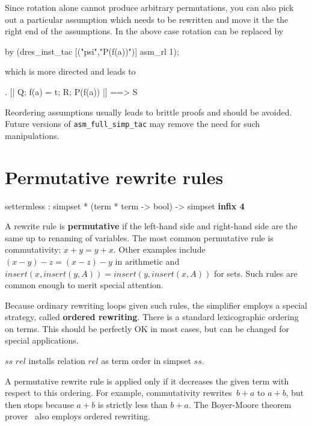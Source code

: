 Since rotation alone cannot produce arbitrary permutations, you can also pick
out a particular assumption which needs to be rewritten and move it the the
right end of the assumptions.  In the above case rotation can be replaced by
\begin{ttbox}
by (dres_inst_tac [("psi","P(f(a))")] asm_rl 1);
\end{ttbox}
which is more directed and leads to
\begin{ttbox}
{. [| Q; f(a) = t; R; P(f(a)) |] ==> S}
\end{ttbox}

\begin{warn}
  Reordering assumptions usually leads to brittle proofs and should be
  avoided.  Future versions of \verb$asm_full_simp_tac$ may remove the
  need for such manipulations.
\end{warn}


\section{Permutative rewrite rules}
\begin{ttbox}
settermless : simpset * (term * term -> bool) -> simpset \hfill{\bf infix 4}
\end{ttbox}

A rewrite rule is {\bf permutative} if the left-hand side and right-hand
side are the same up to renaming of variables.  The most common permutative
rule is commutativity: $x+y = y+x$.  Other examples include $(x-y)-z =
(x-z)-y$ in arithmetic and $insert(x,insert(y,A)) = insert(y,insert(x,A))$
for sets.  Such rules are common enough to merit special attention.

Because ordinary rewriting loops given such rules, the simplifier
employs a special strategy, called {\bf ordered
  rewriting}.  There is a standard
lexicographic ordering on terms.  This should be perfectly OK in most
cases, but can be changed for special applications.

\begin{ttdescription}
  
\item[$ss$ \ttindexbold{settermless} $rel$] installs relation $rel$ as
  term order in simpset $ss$.

\end{ttdescription}

\medskip

A permutative rewrite rule is applied only if it decreases the given
term with respect to this ordering.  For example, commutativity
rewrites~$b+a$ to $a+b$, but then stops because $a+b$ is strictly less
than $b+a$.  The Boyer-Moore theorem prover~\cite{bm88book} also
employs ordered rewriting.

